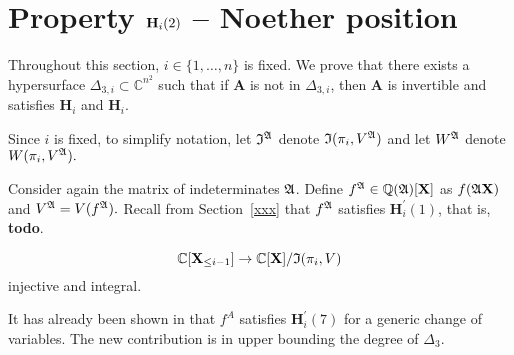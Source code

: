 \documentclass[sigconf]{acmart}
\def\td{{\bf todo}}
\def\mA{{\bm A}}
\def\C{\mathbb{C}}
\def\D{\Delta}
\def\I{\frak{I}}
\def\A{\frak{A}}
\begin{document}

\section{Property ${\bf H}_i(2)$ -- Noether position}

Throughout this section,  $i \in \{1,\hdots,n\}$ is
fixed. We prove that there exists a hypersurface $\D_{3,i} \subset
\C^{n^2}$ such that if $\mA$ is not in $\D_{3,i}$, then $\mA$ is
invertible and satisfies $\textbf{H}_i$ and $\textbf{H}_i$.

Since $i$ is fixed, to simplify notation, let $\I^\A$ denote
$\I(\pi_i,V^\A)$ and let $W^\A$ denote $W(\pi_i,V^\A).$

Consider again the matrix of indeterminates $\A$.  Define $f^{\A} \in
\mathbb{Q}(\A)[\textbf{X}]$ as $f(\A\textbf{X})$ and $V^\A=V(f^\A).$
Recall from Section~\ref{xxx} that $f^\A$ satisfies
$\textbf{H}_i^{'}(1)$, that is, \td.




\[
\C[\textbf{X}_{\leq i-1}]\rightarrow\C[\textbf{X}]/\frak{I}(\pi_i,V)
\]
injective and  integral.
%

It has already been shown in \cite{EMP} that $f^A$ satisfies
$\textbf{H}_i^{'}(7)$ for a generic change of variables. The new
contribution is in upper bounding the degree of $\Delta_3.$
\end{document}
